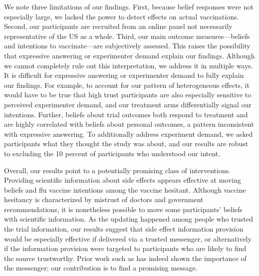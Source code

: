 We note three limitations of our findings. 
First, because belief responses were not especially large, we lacked the power 
to detect effects on actual vaccinations. 
Second, our participants are recruited from an online panel not necessarily representative
of the US as a whole.
Third, our main outcome measures---beliefs and intentions to vaccinate---are subjectively
assessed. This raises the possibility that expressive answering or experimenter demand explain 
our findings. Although we cannot completely rule out this interpretation, we address it in multiple ways.
It is difficult for 
expressive answering or experimenter demand to fully explain our findings. For example, to 
account for our pattern of heterogeneous effects, it would have to be true that high trust 
participants are also especially sensitive to perceived experimenter demand, and 
our treatment arms differentially signal our intentions. Further, beliefs about 
trial outcomes both respond to treatment and are highly correlated with beliefs about
personal outcomes, a pattern inconsistent with expressive answering. To additionally address experiment demand,
we asked participants what they thought the study was about, and our results are 
robust to excluding the 10 percent of participants who understood our intent.

Overall, our results point to a potentially promising class of interventions. 
Providing scientific information about side effects appears effective at moving beliefs 
and flu vaccine intentions among the vaccine hesitant. Although vaccine 
hesitancy is characterized by mistrust of doctors and government recommendations, 
it is nonetheless possible to 
move some participants’ beliefs with scientific information. As the updating happened 
among people who trusted the trial information, our results suggest that side effect 
information provision would be especially effective if delivered via a trusted messenger, or
alternatively if the information provision were targeted to participants who are likely to 
find the source trustworthy. Prior work such as \citet{alsan2024experimental,larsen2023counter} has indeed
shown the importance of the messenger; our contribution is to find a promising message. 



